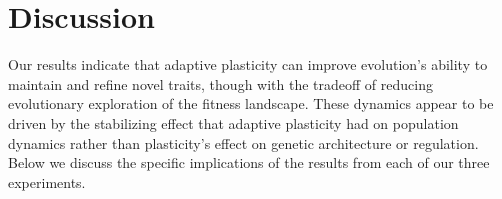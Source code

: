 





\section{Discussion}


Our results indicate that adaptive plasticity can improve evolution's ability to maintain and refine novel traits, though with the tradeoff of reducing evolutionary exploration of the fitness landscape.
These dynamics appear to be driven by the stabilizing effect that adaptive plasticity had on population dynamics rather than plasticity's effect on genetic architecture or regulation.
Below we discuss the specific implications of the results from each of our three experiments.

